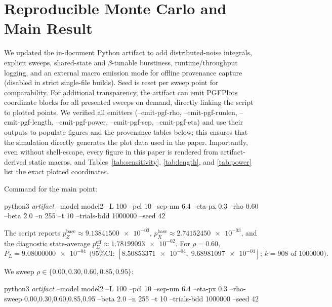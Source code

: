 \documentclass{article}
\newcommand{\cmd}[1]{\par\noindent\begingroup\scriptsize\ttfamily\raggedright\sloppy #1\par\endgroup}
\newcommand{\val}[1]{\num[round-mode=figures,round-precision=3]{#1}}
\newcommand{\simL}{100}
\newcommand{\simpcl}{10}
\newcommand{\simsep}{6.4}
\newcommand{\simeta}{0.3}
\newcommand{\simn}{255}
\newcommand{\simt}{10}
\newcommand{\simtrials}{1000000}
\newcommand{\simseed}{42}
\newcommand{\simpz}{9.13841500e-03}
\newcommand{\simpx}{2.74152450e-03}
\newcommand{\simpesum}{1.78199093e-02}
\newcommand{\simrhoB}{0.60}
\newcommand{\simpLB}{9.08000000e-04}
\newcommand{\simpLBlo}{8.50853371e-04}
\newcommand{\simpLBhi}{9.68981097e-04}
\newcommand{\simkB}{908}
\newcommand{\simrhoD}{0.00}
\newcommand{\simrhoA}{0.30}
\newcommand{\simrhoC}{0.85}
\newcommand{\simrhoE}{0.95}
\begin{document}
\section{Reproducible Monte Carlo and Main Result}\label{sec:results}
We updated the in-document Python artifact to add distributed-noise integrals, explicit sweeps, shared-state and \(\beta\)-tunable burstiness, runtime/throughput logging, and an external macro emission mode for offline provenance capture (disabled in strict single-file builds). Seed is reset per sweep point for comparability. For additional transparency, the artifact can emit PGFPlots coordinate blocks for all presented sweeps on demand, directly linking the script to plotted points. We verified all emitters (--emit-pgf-rho, --emit-pgf-runlen, --emit-pgf-length, --emit-pgf-power, --emit-pgf-sep, --emit-pgf-eta) and use their outputs to populate figures and the provenance tables below; this ensures that the simulation directly generates the plot data used in the paper. Importantly, even without shell-escape, every figure in this paper is rendered from artifact-derived static macros, and Tables~\ref{tab:sensitivity}, \ref{tab:length}, and \ref{tab:power} list the exact plotted coordinates.

Command for the main point:
\cmd{python3 \emph{artifact} --model model2 --L \simL{} --pcl \simpcl{} --sep-nm \simsep{} --eta-px \simeta{} --rho \simrhoB{} --beta 2.0 --n \simn{} --t \simt{} --trials-bdd \simtrials{} --seed \simseed}

The script reports \(p_Z^{\text{base}}\approx \val{\simpz}\), \(p_X^{\text{base}}\approx \val{\simpx}\), and the diagnostic state-average \(p_{\Sigma}^{\mathrm{eff}}\approx \val{\simpesum}\). For \(\rho=\simrhoB\),
\[
P_L=\val{\simpLB}\ \ \text{(95\% CI: }[\val{\simpLBlo},\;\val{\simpLBhi}]\text{; }k=\simkB\text{ of } \simtrials\text{)}.
\]

We sweep \(\rho\in\{\simrhoD,\simrhoA,\simrhoB,\simrhoC,\simrhoE\}\):
\cmd{python3 \emph{artifact} --model model2 --L \simL{} --pcl \simpcl{} --sep-nm \simsep{} --eta-px \simeta{} --rho-sweep \simrhoD{},\simrhoA{},\simrhoB{},\simrhoC{},\simrhoE{} --beta 2.0 --n \simn{} --t \simt{} --trials-bdd \simtrials{} --seed \simseed}
\end{document}
